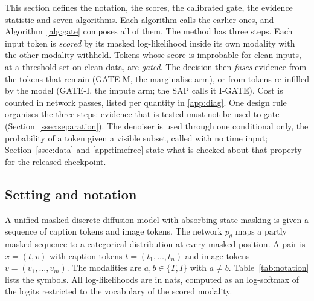 
This section defines the notation, the scores, the calibrated gate, the evidence statistic and seven algorithms.
Each algorithm calls the earlier ones, and Algorithm~\ref{alg:gate} composes all of them.
The method has three steps.
Each input token is \emph{scored} by its masked log-likelihood inside its own modality with the other modality withheld.
Tokens whose score is improbable for clean inputs, at a threshold set on clean data, are \emph{gated}.
The decision then \emph{fuses} evidence from the tokens that remain (GATE-M, the marginalise arm), or from tokens re-infilled by
the model (GATE-I, the impute arm; the SAP calls it I-GATE).
Cost is counted in network passes, listed per quantity in \ref{app:diag}.
One design rule organises the three steps: evidence that is tested must not be used to gate (Section~\ref{ssec:separation}).
The denoiser is used through one conditional only, the probability of a token given a visible subset, called with no time
input; Section~\ref{ssec:data} and \ref{app:timefree} state what is checked about that property for the released
checkpoint.

\subsection{Setting and notation}\label{ssec:notation}
A unified masked discrete diffusion model with absorbing-state masking is given a sequence of caption tokens and image tokens.
The network $p_\theta$ maps a partly masked sequence to a categorical distribution at every masked position.
A pair is $x=(t,v)$ with caption tokens $t=(t_1,\dots,t_n)$ and image tokens $v=(v_1,\dots,v_m)$.
The modalities are $a,b\in\{T,I\}$ with $a\neq b$.
Table~\ref{tab:notation} lists the symbols.
All log-likelihoods are in nats, computed as an \fp{} log-softmax of the logits restricted to the vocabulary of the scored
modality.

